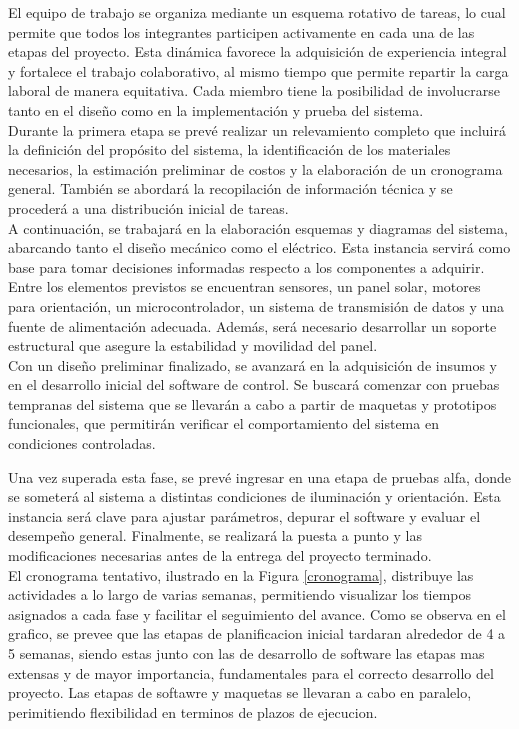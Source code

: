 \documentclass[a4paper,12pt]{article}
\begin{document}
El equipo de trabajo se organiza mediante un esquema rotativo de tareas, lo cual permite que todos los integrantes participen activamente en cada una de las etapas del proyecto. Esta dinámica favorece la adquisición de experiencia integral y fortalece el trabajo colaborativo, al mismo tiempo que permite repartir la carga laboral de manera equitativa. Cada miembro tiene la posibilidad de involucrarse tanto en el diseño como en la implementación y prueba del sistema.\\

Durante la primera etapa se prevé realizar un relevamiento completo que incluirá la definición del propósito del sistema, la identificación de los materiales necesarios, la estimación preliminar de costos y la elaboración de un cronograma general. También se abordará la recopilación de información técnica y se procederá a una distribución inicial de tareas.\\

A continuación, se trabajará en la elaboración esquemas y diagramas del sistema, abarcando tanto el diseño mecánico como el eléctrico. Esta instancia servirá como base para tomar decisiones informadas respecto a los componentes a adquirir. Entre los elementos previstos se encuentran sensores, un panel solar, motores para orientación, un microcontrolador, un sistema de transmisión de datos y una fuente de alimentación adecuada. Además, será necesario desarrollar un soporte estructural que asegure la estabilidad y movilidad del panel.\\

Con un diseño preliminar finalizado, se avanzará en la adquisición de insumos y en el desarrollo inicial del software de control. Se buscará comenzar con pruebas tempranas del sistema que se llevarán a cabo a partir de maquetas y prototipos funcionales, que permitirán verificar el comportamiento del sistema en condiciones controladas.

Una vez superada esta fase, se prevé ingresar en una etapa de pruebas alfa, donde se someterá al sistema a distintas condiciones de iluminación y orientación. Esta instancia será clave para ajustar parámetros, depurar el software y evaluar el desempeño general. Finalmente, se realizará la puesta a punto y las modificaciones necesarias antes de la entrega del proyecto terminado.\\

El cronograma tentativo, ilustrado en la Figura \ref{cronograma}, distribuye las actividades a lo largo de varias semanas, permitiendo visualizar los tiempos asignados a cada fase y facilitar el seguimiento del avance.
Como se observa en el grafico, se prevee que las etapas de planificacion inicial tardaran alrededor de 4 a 5 semanas, siendo estas junto con las de desarrollo de software las etapas mas extensas y de mayor importancia, fundamentales para el correcto desarrollo del proyecto. Las etapas de softawre y maquetas se llevaran a cabo en paralelo, perimitiendo flexibilidad en terminos de plazos de ejecucion.\\
\end{document}
